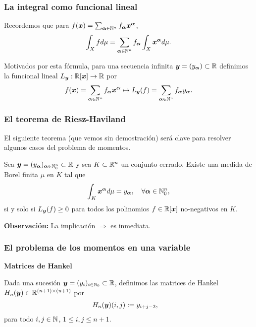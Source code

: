 \documentclass[aspectratio=169,12pt,spanish]{beamer}
\begin{document}

\begin{frame}

\frametitle{La integral como funcional lineal}

Recordemos que para $f(\bm{x}) = \sum_{\bm{\alpha} \in \mathbb{N}^n} f_{\bm{\alpha}} \bm{x}^{\bm{\alpha}}$,
$$
\int_X f d\mu = \sum_{\bm{\alpha} \in \mathbb{N}^n} f_{\bm{\alpha}} \int_X \bm{x}^{\bm{\alpha}} d\mu.
$$

Motivados por esta fórmula, para una secuencia infinita $\bm{y} = (y_{\bm{\alpha}}) \subset \mathbb{R}$ definimos la funcional lineal $L_{\bm{y}}: \mathbb{R}[\bm{x}] \rightarrow \mathbb{R}$ por
$$
f(\bm{x}) = \sum_{\bm{\alpha} \in \mathbb{N}^n} f_{\bm{\alpha}} \bm{x}^{\bm{\alpha}} \mapsto L_{\bm{y}}(f) = \sum_{\bm{\alpha} \in \mathbb{N}^n} f_{\bm{\alpha}} y_{\bm{\alpha}}.
$$
\end{frame}


\begin{frame}

\frametitle{El teorema de Riesz-Haviland}

El siguiente teorema (que vemos sin demostración) será clave para resolver algunos casos del problema de momentos.

\begin{theorem}
\label{teo:Riesz}
Sea $\bm{y} = (y_{\bm{\alpha}})_{\bm{\alpha} \in \mathbb{N}_0^n} \subset \mathbb{R}$ y sea $K \subset \mathbb{R}^n$ un conjunto cerrado.
Existe una medida de Borel finita $\mu$ en $K$ tal que
$$
\int_K \bm{x}^{\bm{\alpha}} d\mu = y_{\bm{\alpha}}, \quad \forall \bm{\alpha} \in \mathbb{N}_0^n,
$$
si y solo si $L_{\bm{y}}(f) \ge 0$ para todos los polinomios $f \in \mathbb{R}[\bm{x}]$ no-negativos en $K$.
\end{theorem}

\textbf{Observación:} La implicación $\Rightarrow$ es inmediata.


\end{frame}


\begin{frame}

\frametitle{El problema de los momentos en una variable}

\textbf{Matrices de Hankel}

Dada una sucesión $\bm{y} = (y_i)_{i \in \mathbb{N}_0} \subset \mathbb{R}$, definimos las matrices de Hankel $H_n(\bm{y}) \in \mathbb{R}^{(n+1) \times (n+1)}$ por
\begin{align*}
H_n(\bm{y})(i,j) &:= y_{i+j-2},
\end{align*}
para todo $i, j \in \mathbb{N}$, $1 \le i,j \le n+1$.


\end{frame}
\end{document}
